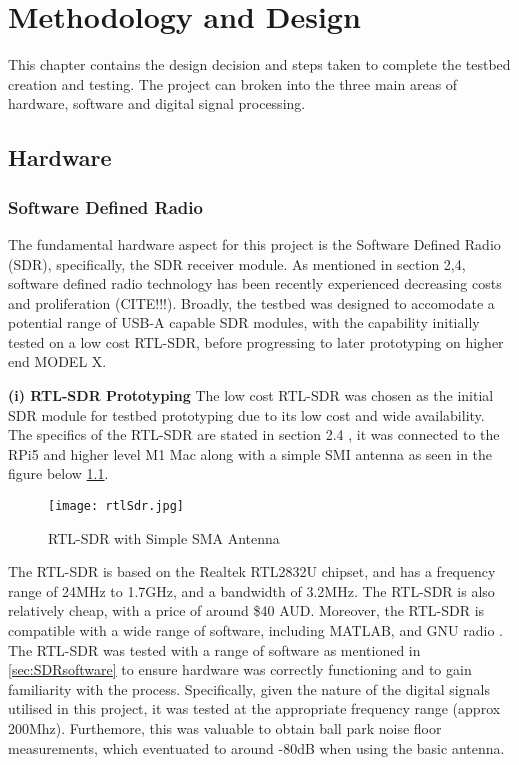 \chapter{Methodology and Design \label{sec:methodology}}

This chapter contains the design decision and steps taken to complete the testbed creation and testing. The project can broken into the three main areas of hardware, software and digital signal processing. 

\section{Hardware \label{sec:hardware}}

\subsection{Software Defined Radio \label{sec: SDRdongle}}
The fundamental hardware aspect for this project is the Software Defined Radio (SDR), specifically, the SDR receiver module.  As mentioned in section 2,4, software defined radio technology has been recently experienced decreasing costs and proliferation (CITE!!!). Broadly, the testbed was designed to accomodate a potential range of USB-A capable SDR modules, with the capability initially tested on a low cost RTL-SDR, before progressing to later prototyping on higher end MODEL X.

\vspace{0.5cm} \noindent 
\textbf{(i) RTL-SDR Prototyping}
The low cost RTL-SDR was chosen as the initial SDR module for testbed prototyping  due to its low cost and wide availability. The specifics of the RTL-SDR are stated in section 2.4 , it was connected to the RPi5 and higher level M1 Mac along with a simple SMI antenna as seen in the figure below \ref*{fig:rtlSDR}. 

\begin{figure}[htbp]
    \centering
    \texttt{[image: rtlSdr.jpg]}
    \caption{RTL-SDR with Simple SMA Antenna}
    \label{fig:rtlSDR}
\end{figure}

The RTL-SDR is based on the Realtek RTL2832U chipset, and has a frequency range of 24MHz to 1.7GHz, and a bandwidth of 3.2MHz. The RTL-SDR is also relatively cheap, with a price of around \$40 AUD. Moreover, the RTL-SDR is compatible with a wide range of software, including MATLAB, and GNU radio \cite{SDRdongle}.
The RTL-SDR was tested with a range of software as mentioned in \ref*{sec:SDRsoftware} to ensure hardware was correctly functioning and to gain familiarity with the process. Specifically, given the nature of the digital signals utilised in this project, it was tested at the appropriate frequency range (approx 200Mhz). Furthemore, this was valuable to obtain ball park noise floor measurements, which eventuated to around -80dB when using the basic antenna.

